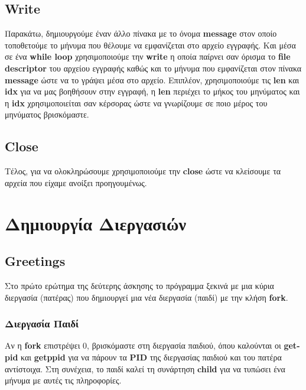 \documentclass[12pt]{article}
\begin{document}
\subsection{\foreignlanguage{english}{Write}}
Παρακάτω, δημιουργούμε έναν άλλο πίνακα με το όνομα
\textbf{\foreignlanguage{english}{message}} στον οποίο τοποθετούμε το μήνυμα
που θέλουμε να
εμφανίζεται στο αρχείο εγγραφής. Και μέσα σε ένα
\textbf{\foreignlanguage{english}{while loop}} χρησιμοποιούμε την
\textbf{\foreignlanguage{english}{write}}
η οποία παίρνει σαν όρισμα το \textbf{\foreignlanguage{english}{file
        descriptor}} του αρχείου εγγραφής καθώς και το μήνυμα που εμφανίζεται
στον
πίνακα
\textbf{\foreignlanguage{english}{message}} ώστε να το γράψει μέσα στο αρχείο.
Επιπλέον, χρησιμοποιούμε τις \textbf{\foreignlanguage{english}{len}} και
\textbf{\foreignlanguage{english}{idx}} για να μας βοηθήσουν στην εγγραφή,
η \textbf{\foreignlanguage{english}{len}} περιέχει το μήκος του μηνύματος και η
\textbf{\foreignlanguage{english}{idx}} χρησιμοποιείται σαν κέρσορας
ώστε να γνωρίζουμε σε ποιο μέρος του μηνύματος βρισκόμαστε.

\subsection{\foreignlanguage{english}{Close}}
Τέλος, για να ολοκληρώσουμε χρησιμοποιούμε την
\textbf{\foreignlanguage{english}{close}} ώστε να κλείσουμε τα αρχεία που
είχαμε ανοίξει προηγουμένως.

\pagebreak

\section{Δημιουργία Διεργασιών}

\subsection{\foreignlanguage{english}{Greetings}}
Στο πρώτο ερώτημα της δεύτερης άσκησης το πρόγραμμα ξεκινά με μια κύρια
διεργασία (πατέρας) που δημιουργεί μια νέα διεργασία (παιδί) με την κλήση
\textbf{\foreignlanguage{english}{fork}}.

\subsubsection{Διεργασία Παιδί}
Αν η \textbf{\foreignlanguage{english}{fork}} επιστρέψει 0, βρισκόμαστε στη
διεργασία παιδιού, όπου καλούνται οι \textbf{\foreignlanguage{english}{getpid}}
και
\textbf{\foreignlanguage{english}{getppid}} για να πάρουν τα
\textbf{\foreignlanguage{english}{PID}} της διεργασίας παιδιού και του πατέρα
αντίστοιχα.
Στη συνέχεια, το παιδί καλεί τη συνάρτηση
\textbf{\foreignlanguage{english}{child}} για να τυπώσει ένα μήνυμα με αυτές
τις πληροφορίες.
\end{document}
